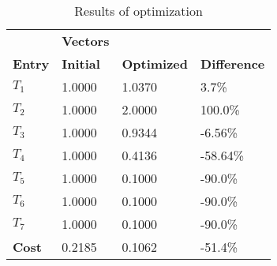 \begin{table}[H]
\centering
\begin{tabular}{llll}
\textbf{}      & \cellcolor[HTML]{EFEFEF}\textbf{Vectors} & \textbf{} & \textbf{}         \\
\rowcolor[HTML]{EFEFEF} 
\textbf{Entry} & \textbf{Initial} & \textbf{Optimized} & \textbf{Difference} \\
$T_1$ & 1.0000 & 1.0370 & 3.7\% \\ 
$T_2$ & 1.0000 & 2.0000 & 100.0\% \\ 
$T_3$ & 1.0000 & 0.9344 & -6.56\% \\ 
$T_4$ & 1.0000 & 0.4136 & -58.64\% \\ 
$T_5$ & 1.0000 & 0.1000 & -90.0\% \\ 
$T_6$ & 1.0000 & 0.1000 & -90.0\% \\ 
$T_7$ & 1.0000 & 0.1000 & -90.0\% \\ 
\rowcolor[HTML]{EFEFEF} 
\textbf{Cost}  & 0.2185 & 0.1062 & -51.4\% \\ 
\end{tabular}
\caption{Results of optimization}
\label{tab:OptimizationAnalysis}
\end{table}